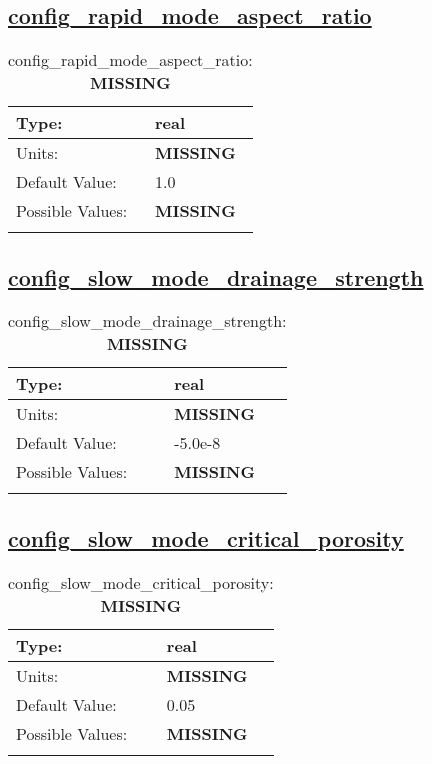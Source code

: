 \subsection[config\_rapid\_mode\_aspect\_ratio]{\hyperref[sec:nm_tab_thermodynamics]{config\_rapid\_mode\_aspect\_ratio}}
\label{subsec:nm_sec_config_rapid_mode_aspect_ratio}
\begin{center}
\begin{longtable}{| p{2.0in} || p{4.0in} |}
    \hline
    Type: & real \\
    \hline
    Units: & {\bf \color{red} MISSING} \\
    \hline
    Default Value: & 1.0 \\
    \hline
    Possible Values: & {\bf \color{red} MISSING} \\
    \hline
    \caption{config\_rapid\_mode\_aspect\_ratio: {\bf \color{red} MISSING}}
\end{longtable}
\end{center}
\subsection[config\_slow\_mode\_drainage\_strength]{\hyperref[sec:nm_tab_thermodynamics]{config\_slow\_mode\_drainage\_strength}}
\label{subsec:nm_sec_config_slow_mode_drainage_strength}
\begin{center}
\begin{longtable}{| p{2.0in} || p{4.0in} |}
    \hline
    Type: & real \\
    \hline
    Units: & {\bf \color{red} MISSING} \\
    \hline
    Default Value: & -5.0e-8 \\
    \hline
    Possible Values: & {\bf \color{red} MISSING} \\
    \hline
    \caption{config\_slow\_mode\_drainage\_strength: {\bf \color{red} MISSING}}
\end{longtable}
\end{center}
\subsection[config\_slow\_mode\_critical\_porosity]{\hyperref[sec:nm_tab_thermodynamics]{config\_slow\_mode\_critical\_porosity}}
\label{subsec:nm_sec_config_slow_mode_critical_porosity}
\begin{center}
\begin{longtable}{| p{2.0in} || p{4.0in} |}
    \hline
    Type: & real \\
    \hline
    Units: & {\bf \color{red} MISSING} \\
    \hline
    Default Value: & 0.05 \\
    \hline
    Possible Values: & {\bf \color{red} MISSING} \\
    \hline
    \caption{config\_slow\_mode\_critical\_porosity: {\bf \color{red} MISSING}}
\end{longtable}
\end{center}
